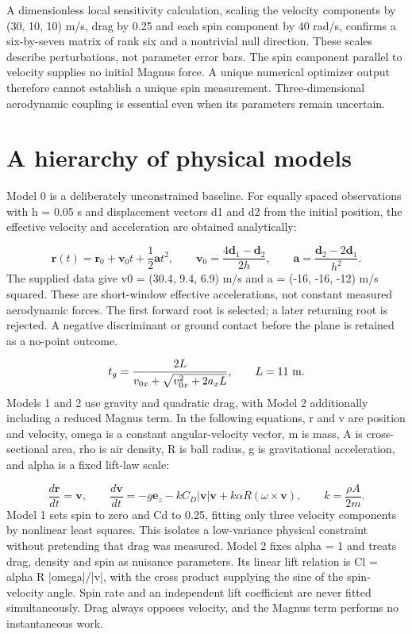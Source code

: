 \documentclass[11pt,a4paper]{article}
\begin{document}
A dimensionless local sensitivity calculation, scaling the velocity components by (30, 10, 10) m/s, drag by 0.25 and each spin component by 40 rad/s, confirms a six-by-seven matrix of rank six and a nontrivial null direction. These scales describe perturbations, not parameter error bars. The spin component parallel to velocity supplies no initial Magnus force. A unique numerical optimizer output therefore cannot establish a unique spin measurement. Three-dimensional aerodynamic coupling is essential even when its parameters remain uncertain.\cite{myers2013}

\section{A hierarchy of physical models}
Model 0 is a deliberately unconstrained baseline. For equally spaced observations with h = 0.05 s and displacement vectors d1 and d2 from the initial position, the effective velocity and acceleration are obtained analytically:

\begin{equation}
\mathbf{r}(t)=\mathbf{r}_0+\mathbf{v}_0t+\frac{1}{2}\mathbf{a}t^2,\qquad \mathbf{v}_0=\frac{4\mathbf{d}_1-\mathbf{d}_2}{2h},\qquad \mathbf{a}=\frac{\mathbf{d}_2-2\mathbf{d}_1}{h^2}.
\end{equation}
The supplied data give v0 = (30.4, 9.4, 6.9) m/s and a = (-16, -16, -12) m/s squared. These are short-window effective accelerations, not constant measured aerodynamic forces. The first forward root is selected; a later returning root is rejected. A negative discriminant or ground contact before the plane is retained as a no-point outcome.

\begin{equation}
t_g=\frac{2L}{v_{0x}+\sqrt{v_{0x}^2+2a_xL}},\qquad L=11\ {\rm m}.
\end{equation}
Models 1 and 2 use gravity and quadratic drag, with Model 2 additionally including a reduced Magnus term. In the following equations, r and v are position and velocity, omega is a constant angular-velocity vector, m is mass, A is cross-sectional area, rho is air density, R is ball radius, g is gravitational acceleration, and alpha is a fixed lift-law scale:

\begin{equation}
\frac{d\mathbf{r}}{dt}=\mathbf{v},\qquad \frac{d\mathbf{v}}{dt}=-g\mathbf{e}_z-k C_D|\mathbf{v}|\mathbf{v}+k\alpha R(\omega\times\mathbf{v}),\qquad k=\frac{\rho A}{2m}.
\end{equation}
Model 1 sets spin to zero and Cd to 0.25, fitting only three velocity components by nonlinear least squares. This isolates a low-variance physical constraint without pretending that drag was measured. Model 2 fixes alpha = 1 and treats drag, density and spin as nuisance parameters. Its linear lift relation is Cl = alpha R |omega|/|v|, with the cross product supplying the sine of the spin-velocity angle. Spin rate and an independent lift coefficient are never fitted simultaneously. Drag always opposes velocity, and the Magnus term performs no instantaneous work.
\end{document}
